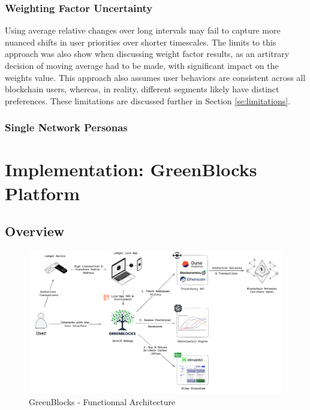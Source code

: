 \documentclass[11pt]{report}
\begin{document}
\subsection*{Weighting Factor Uncertainty}
Using average relative changes over long intervals may fail to capture more nuanced shifts in user priorities over shorter timescales. The limits to this approach was also show when discussing weight factor results, as an artitrary decision of moving average had to be made, with significant impact on the weights value. This approach also assumes user behaviors are consistent across all blockchain users, whereas, in reality, different segments likely have distinct preferences. These limitations are discussed further in Section \ref{se:limitations}.


\subsection*{Single Network Personas}





\chapter{Implementation: GreenBlocks Platform}
\section{Overview \label{se:implementation_overview}}
\begin{figure}[h!]
    \centering
    \centerline{\includegraphics[scale=0.08]{figures/functionnal architecture.png}}
    \caption{GreenBlocks - Functionnal Architecture}
    \label{fig:functionnal_architecture}
\end{figure}
\end{document}

